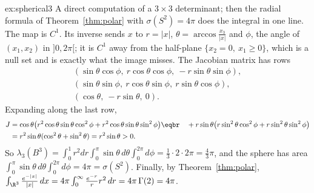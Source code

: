 \begin{solution}{ex:spherical3}
\idea A direct computation of a $3\times3$ determinant; then the radial formula of Theorem~\ref{thm:polar} with $\sigma(S^2)=4\pi$ does the integral in one line.
\writeup The map is $C^1$. Its inverse sends $x$ to $r=|x|$, $\theta=\arccos\frac{x_3}{|x|}$ and $\phi$, the angle of $(x_1,x_2)$ in $]0,2\pi[$; it is $C^1$ away from the half-plane $\{x_2=0,\ x_1\ge0\}$, which is a null
set and is exactly what the image misses. The Jacobian matrix has rows
\[\begin{gathered}(\sin\theta\cos\phi,\ r\cos\theta\cos\phi,\ -r\sin\theta\sin\phi),\\(\sin\theta\sin\phi,\ r\cos\theta\sin\phi,\ r\sin\theta\cos\phi),\\(\cos\theta,\ -r\sin\theta,\ 0).\end{gathered}\] Expanding along the last row,
\[\begin{aligned}J&=\cos\theta\bigl(r^2\cos\theta\sin\theta\cos^2\phi+r^2\cos\theta\sin\theta\sin^2\phi\bigr)\eqbr\quad+r\sin\theta\bigl(r\sin^2\theta\cos^2\phi+r\sin^2\theta\sin^2\phi\bigr)\\&=r^2\sin\theta(\cos^2\theta+\sin^2\theta)=r^2\sin\theta>0.\end{aligned}\]
So $\lambda_3(B^3)=\int_0^1r^2dr\int_0^\pi\sin\theta\,d\theta\int_0^{2\pi}d\phi=\frac13\cdot2\cdot2\pi=\frac43\pi$, and the sphere has area $\int_0^\pi\sin\theta\,d\theta\int_0^{2\pi}d\phi=4\pi=\sigma(S^2)$. Finally, by
Theorem~\ref{thm:polar}, $\int_{\R^3}\frac{e^{-|x|}}{|x|}\,dx=4\pi\int_0^\infty\frac{e^{-r}}rr^2\,dr=4\pi\,\Gamma(2)=4\pi$.
\end{solution}

